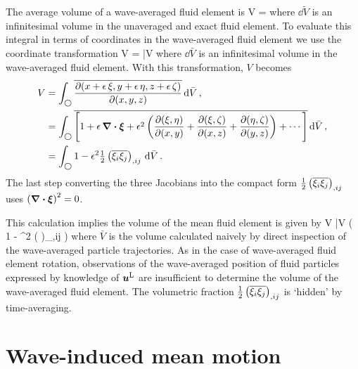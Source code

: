 \documentclass[12pt, oneside]{book}
\begin{document}
The average volume of a wave-averaged fluid element is
\beq
V =  \com
\eeq
where $\dd \tilde V$ is an infinitesimal volume in the unaveraged and exact fluid element.  To evaluate this integral in terms of coordinates in the wave-averaged fluid element we use the coordinate transformation
\beq
\dd \tilde V = \frac{\p \left ( \bx + \ep \, \bxi \right )}{\p \left ( \bx \right )} \dd \bar V \com
\eeq
where $\dd \bar V$ is an infinitesimal volume in the wave-averaged fluid element.  With this transformation, $V$ becomes
\begin{align}
V &= \int_{\bigcirc} \overline{ \frac{\partial(x+\epsilon \, \xi,y+\epsilon \,  \eta,z+\epsilon \,  \zeta)}{\partial(x,y,z)} } {\, \rm d} \bar V \, , \\
&= \int_{\bigcirc} \overline{ \Bigg [ 1 + \epsilon \, \boldsymbol \nabla \boldsymbol \cdot \boldsymbol {\xi} + \epsilon^2 \left ( \frac{\partial (\xi,\eta)}{\partial(x,y)} +  \frac{\partial (\xi,\zeta)}{\partial(x,z)} +  \frac{\partial (\eta,\zeta)}{\partial(y,z)} \right ) + \cdots \Bigg ] } {\, \rm d} \bar V \, , \label{waveAveragedVolume2} \\
&= \int_{\bigcirc} 1 - \epsilon^2 \tfrac{1}{2} \left ( \overline{ \xi_i \xi_j } \right )_{,ij} {\, \rm d} \bar V \, .
\end{align}
The last step converting the three Jacobians into the compact form $\tfrac{1}{2} \left ( \overline{\xi_i \xi_j} \right )_{,ij}$ uses $\left ( \boldsymbol \nabla \boldsymbol \cdot \boldsymbol {\xi} \right )^2 = 0$.  

This calculation implies the volume of the mean fluid element is given by
\beq
V \approx \bar V \left ( 1 - \ep^2 \half \left (  \right )_{,ij} \right ) \com
\eeq
where $\bar V$ is the volume calculated naively by direct inspection of the wave-averaged particle trajectories.  As in the case of wave-averaged fluid element rotation, observations of the wave-averaged position of fluid particles expressed by knowledge of $\boldsymbol{u}^{\mathrm{L}}$ are insufficient to determine the volume of the wave-averaged fluid element.  The volumetric fraction $\tfrac{1}{2} \left ( \overline{\xi_i \xi_j } \right )_{,ij}$ is `hidden' by time-averaging.

\section{Wave-induced mean motion}
\label{examples}
\end{document}

